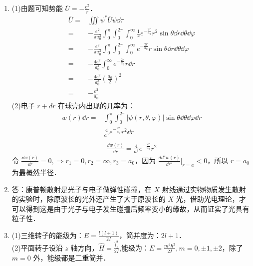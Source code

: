 
\begin{issues}
\issueDraft
\end{issues}


\subsection{ }
\begin{enumerate}
\item 
(1)由题可知势能 $\overline{U}=-\frac{e^2}{r}$．
\begin{equation}
\begin{aligned}
\overline{U}=&\iiint \psi^{*} \overline{U} \psi \dd{\tau}\\
=&-\frac{e^2}{\pi a^{3}_{0}}\int^{\pi}_{0}\int^{2\pi}_{0}\int^{\infty}_{0} \frac{1}{r}e^{-\frac{2r}{a_0}}r^{2}\sin{\theta} \dd{r}\dd{\theta}\dd{\varphi}\\
=&-\frac{e^{2}}{\pi a^{3}_{0}}\int^{\pi}_{0}\int^{2\pi}_{0}\int^{\infty}_{0} e^{-\frac{2r}{a_0}}r\sin{\theta} \dd{r}\dd{\theta}\dd{\varphi}\\
=&-\frac{4 e^2}{a^{3}_{0}}\int^{\infty}_{0}e^{-\frac{2r}{a_0}}r\dd{r}\\
=&-\frac{4e^{2}}{a^{3}_{0}}(\frac{a_{0}}{2})^2\\
=&-\frac{e^{2}}{a_{0}}
\end{aligned}
\end{equation}
(2)电子 $r+dr$ 在球壳内出现的几率为：\\
\begin{equation}
\begin{aligned}
w(r)\dd{r}=&\int^{\pi}_{0}\int^{2\pi}_{0} \lvert \psi(r,\theta,\varphi) \rvert \sin{\theta}\dd{\theta}\dd{\varphi}\dd{r}\\
=&\frac{4}{a^{3}}e^{-\frac{2r}{a_0}}r^2 \dd{r}\\
\end{aligned}
\end{equation}
\begin{equation}
\begin{aligned}
\frac{\dd{w(r)}}{\dd{r}}=\frac{4}{a^{3}}e^{-\frac{2r}{a_0}}r^2 
\end{aligned}
\end{equation}
令 $\frac{\dd{w(r)}}{\dd{r}}=0,\Longrightarrow r_1 = 0,r_2 = \infty,r_3 = a_0$，因为 $\frac{dd^{2}{w(r)}}{\dd{r^{2}}}|_{r = a_{}} < 0$，所以 $r = a_0$ 为最概然半径．

\item
答：康普顿散射是光子与电子做弹性碰撞，在 $X$ 射线通过实物物质发生散射的实验时，除原波长的光外还产生了大于原波长的 $X$ 光，借助光电理论，才可以得到这是由于光子与电子发生碰撞后频率变小的缘故，从而证实了光具有粒子性．

\item 
(1)三维转子的能级为：$E = \frac{l(l+1)}{2I}$，简并度为：$2l+1$．\\
(2)平面转子设沿 $z$ 轴方向，$\hat{H} = \frac{\hat{l}^{2}_{z}}{2I}$,能级为：$E = \frac{m^{2} \hbar^{2}}{2I} ,m = 0 , \pm 1 , \pm 2$，除了 $m = 0$ 外，能级都是二重简并．
\end{enumerate}
